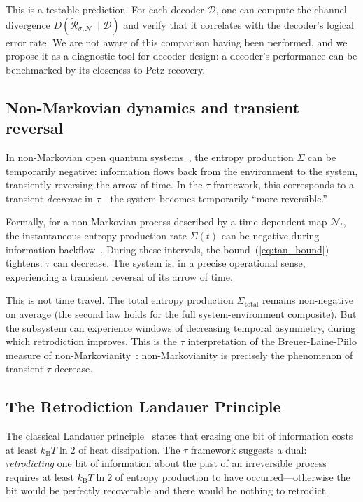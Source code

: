 \documentclass[12pt]{article}
\theoremstyle{definition}
\theoremstyle{remark}
\newcommand{\kB}{k_{\mathrm{B}}}
\newcommand{\Petz}{\mathcal{R}}
\newcommand{\chan}{\mathcal{N}}
\newcommand{\tauasym}{\tau}
\begin{document}
This is a testable prediction.  For each decoder $\mathcal{D}$,
one can compute the channel divergence
$D(\tilde{\Petz}_{\sigma,\chan}\|\mathcal{D})$ and verify that
it correlates with the decoder's logical error rate.  We are not
aware of this comparison having been performed, and we propose it
as a diagnostic tool for decoder design: a decoder's performance
can be benchmarked by its closeness to Petz recovery.

\subsection{Non-Markovian dynamics and transient reversal}

In non-Markovian open quantum systems~\cite{Breuer2016}, the
entropy production $\Sigma$ can be temporarily negative: information
flows back from the environment to the system, transiently
reversing the arrow of time.  In the $\tauasym$ framework, this
corresponds to a transient \emph{decrease} in $\tauasym$---the
system becomes temporarily ``more reversible.''

Formally, for a non-Markovian process described by a time-dependent
map $\chan_t$, the instantaneous entropy production rate
$\dot{\Sigma}(t)$ can be negative during information
backflow~\cite{Breuer2016}.  During these intervals,
the bound~(\ref{eq:tau_bound}) tightens: $\tauasym$ can decrease.
The system is, in a precise operational sense, experiencing a
transient reversal of its arrow of time.

This is not time travel.  The total entropy production
$\Sigma_{\text{total}}$ remains non-negative on average (the
second law holds for the full system-environment composite).
But the subsystem can experience windows of decreasing temporal
asymmetry, during which retrodiction improves.  This is the
$\tauasym$ interpretation of the Breuer-Laine-Piilo measure of
non-Markovianity~\cite{Breuer2016}: non-Markovianity is
precisely the phenomenon of transient $\tauasym$ decrease.

\subsection{The Retrodiction Landauer Principle}

The classical Landauer principle~\cite{Landauer1961} states that
erasing one bit of information costs at least $\kB T \ln 2$ of
heat dissipation.  The $\tauasym$ framework suggests a dual:
\emph{retrodicting} one bit of information about the past of an
irreversible process requires at least $\kB T \ln 2$ of entropy
production to have occurred---otherwise the bit would be
perfectly recoverable and there would be nothing to retrodict.
\end{document}
